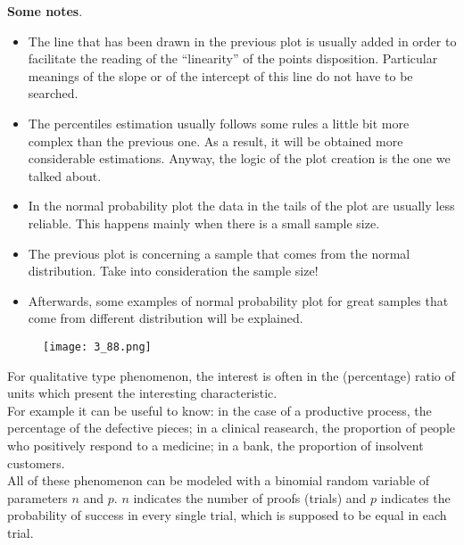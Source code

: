 \begin{frame}
  \begin{small}
    \textbf{Some notes}.
    \begin{itemize}
      \item The line that has been drawn in the previous plot is usually added in order to facilitate the reading of the ``linearity'' of the points disposition. Particular meanings of the slope or of the intercept of this line do not have to be searched.
      \item The percentiles estimation usually follows some rules a little bit more complex than the previous one. As a result, it will be obtained more considerable estimations. Anyway, the logic of the plot creation is the one we talked about.
      \item  In the normal probability plot the data in the tails of the plot are usually less reliable. This happens mainly when there is a small sample size.
      \item The previous plot is concerning a sample that comes from the normal distribution. Take into consideration the sample size!
      \item Afterwards, some examples of normal probability plot for great samples that come from different distribution will be explained.
    \end{itemize}
  \end{small}
\end{frame}

\begin{frame}
  \vspace*{.25cm}
  \begin{figure}
    \texttt{[image: 3\_88.png]}
  \end{figure}
\end{frame}





\begin{frame}
  \vspace*{.75cm}
  For qualitative type phenomenon, the interest is often in the (percentage) ratio of units which present the interesting characteristic.\\
  \vspace*{.5cm}
  For example it can be useful to know: in the case of a productive process, the percentage of the defective pieces; in a clinical reasearch, the proportion of people who positively respond to a medicine; in a bank, the proportion of insolvent customers.\\
  \vspace*{.5cm}
  All of these phenomenon can be modeled with a binomial random variable of parameters $ n $ and $ p $. $ n $ indicates the number of proofs (trials) and $ p $ indicates the probability of success in every single trial, which is supposed to be equal in each trial.\\
\end{frame}

